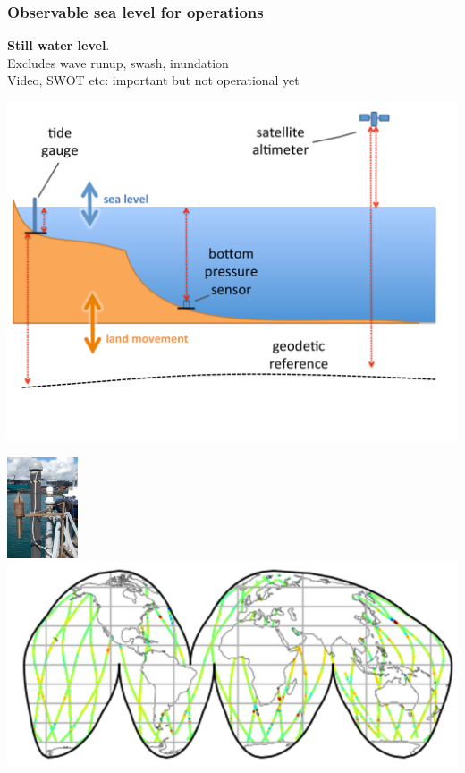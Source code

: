 \begin{frame}
\frametitle{Observable sea level for operations}
\textbf{Still water level}.\\
Excludes wave runup, swash, inundation\\
Video, SWOT etc: important but not operational yet
\begin{minipage}{0.6\textwidth}
    \includegraphics[width=\textwidth]{figures/diagrams/sealevel_cartoon.pdf}
\end{minipage}
\begin{minipage}{0.35\textwidth}
    \includegraphics[height=3cm]{figures/images/tidegaugeEg.png}
    \vspace{1cm}
    \includegraphics[width=\textwidth]{figures/maps/altimeterCoverageEg.png}
\end{minipage}
\end{frame}
